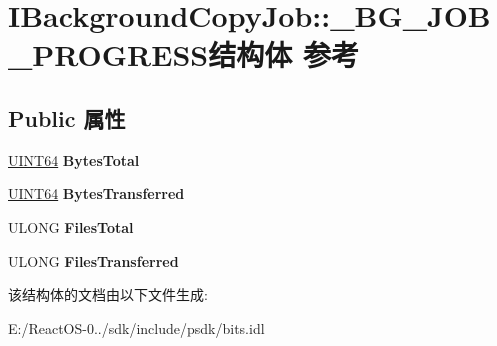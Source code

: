 \hypertarget{struct_i_background_copy_job_1_1___b_g___j_o_b___p_r_o_g_r_e_s_s}{}\section{I\+Background\+Copy\+Job\+:\+:\+\_\+\+B\+G\+\_\+\+J\+O\+B\+\_\+\+P\+R\+O\+G\+R\+E\+S\+S结构体 参考}
\label{struct_i_background_copy_job_1_1___b_g___j_o_b___p_r_o_g_r_e_s_s}
\subsection*{Public 属性}
\begin{DoxyCompactItemize}
\item 
\mbox{\label{struct_i_background_copy_job_1_1___b_g___j_o_b___p_r_o_g_r_e_s_s_a2adb80d45a0010d1e2efe85cbf15bbae}} 
\hyperlink{_processor_bind_8h_a57be03562867144161c1bfee95ca8f7c}{U\+I\+N\+T64} {\bfseries Bytes\+Total}
\item 
\mbox{\label{struct_i_background_copy_job_1_1___b_g___j_o_b___p_r_o_g_r_e_s_s_a2f92b46bbecc9d5f12aca5df92d0fa6f}} 
\hyperlink{_processor_bind_8h_a57be03562867144161c1bfee95ca8f7c}{U\+I\+N\+T64} {\bfseries Bytes\+Transferred}
\item 
\mbox{\label{struct_i_background_copy_job_1_1___b_g___j_o_b___p_r_o_g_r_e_s_s_acee94e5ad494f5d7fc7f0810fec5a875}} 
U\+L\+O\+NG {\bfseries Files\+Total}
\item 
\mbox{\label{struct_i_background_copy_job_1_1___b_g___j_o_b___p_r_o_g_r_e_s_s_a41f985d60746c4a43257e3fb09f952b5}} 
U\+L\+O\+NG {\bfseries Files\+Transferred}
\end{DoxyCompactItemize}


该结构体的文档由以下文件生成\+:\begin{DoxyCompactItemize}
\item 
E\+:/\+React\+O\+S-\/0../sdk/include/psdk/bits.\+idl\end{DoxyCompactItemize}
